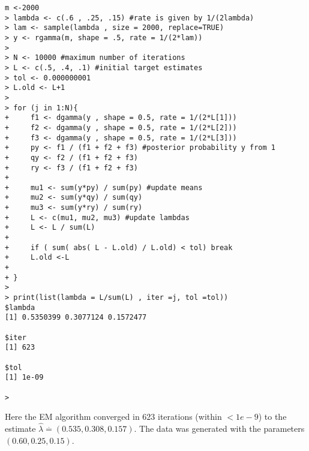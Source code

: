\documentclass[12pt]{article}
\begin{document}
\begin{flushleft}
\begin{verbatim}
m <-2000
> lambda <- c(.6 , .25, .15) #rate is given by 1/(2lambda)
> lam <- sample(lambda , size = 2000, replace=TRUE)
> y <- rgamma(m, shape = .5, rate = 1/(2*lam))
> 
> N <- 10000 #maximum number of iterations
> L <- c(.5, .4, .1) #initial target estimates
> tol <- 0.000000001
> L.old <- L+1
> 
> for (j in 1:N){
+     f1 <- dgamma(y , shape = 0.5, rate = 1/(2*L[1]))
+     f2 <- dgamma(y , shape = 0.5, rate = 1/(2*L[2]))
+     f3 <- dgamma(y , shape = 0.5, rate = 1/(2*L[3]))
+     py <- f1 / (f1 + f2 + f3) #posterior probability y from 1
+     qy <- f2 / (f1 + f2 + f3)
+     ry <- f3 / (f1 + f2 + f3)
+ 
+     mu1 <- sum(y*py) / sum(py) #update means
+     mu2 <- sum(y*qy) / sum(qy)
+     mu3 <- sum(y*ry) / sum(ry)
+     L <- c(mu1, mu2, mu3) #update lambdas
+     L <- L / sum(L)
+ 
+     if ( sum( abs( L - L.old) / L.old) < tol) break
+     L.old <-L
+     
+ }
> 
> print(list(lambda = L/sum(L) , iter =j, tol =tol))
$lambda
[1] 0.5350399 0.3077124 0.1572477

$iter
[1] 623

$tol
[1] 1e-09

> 
\end{verbatim}

Here the EM algorithm converged in 623 iterations (within $< 1 e - 9$) to the estimate $\hat{\lambda} \stackrel{.}{=} (0.535, 0.308, 0.157)$. The data was generated with the parameters $(0.60, 0.25, 0.15)$.




\end{flushleft}
\end{document}

